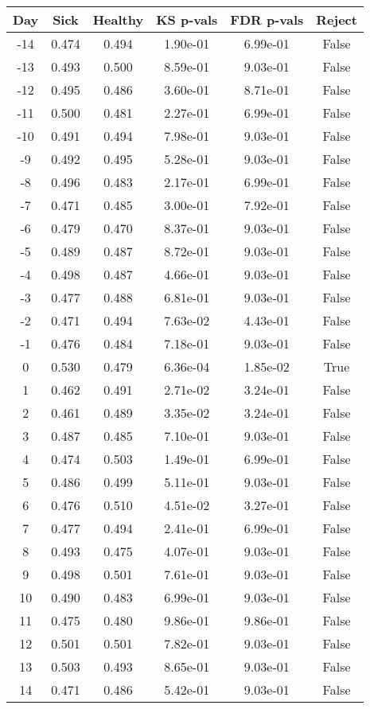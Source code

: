 \begin{tabular}{c|c|c|c|c|c}
Day &  Sick & Healthy &  KS p-vals & FDR p-vals & Reject\\
\hline
-14 & 0.474 &   0.494 &   1.90e-01 &   6.99e-01 &  False\\
-13 & 0.493 &   0.500 &   8.59e-01 &   9.03e-01 &  False\\
-12 & 0.495 &   0.486 &   3.60e-01 &   8.71e-01 &  False\\
-11 & 0.500 &   0.481 &   2.27e-01 &   6.99e-01 &  False\\
-10 & 0.491 &   0.494 &   7.98e-01 &   9.03e-01 &  False\\
 -9 & 0.492 &   0.495 &   5.28e-01 &   9.03e-01 &  False\\
 -8 & 0.496 &   0.483 &   2.17e-01 &   6.99e-01 &  False\\
 -7 & 0.471 &   0.485 &   3.00e-01 &   7.92e-01 &  False\\
 -6 & 0.479 &   0.470 &   8.37e-01 &   9.03e-01 &  False\\
 -5 & 0.489 &   0.487 &   8.72e-01 &   9.03e-01 &  False\\
 -4 & 0.498 &   0.487 &   4.66e-01 &   9.03e-01 &  False\\
 -3 & 0.477 &   0.488 &   6.81e-01 &   9.03e-01 &  False\\
 -2 & 0.471 &   0.494 &   7.63e-02 &   4.43e-01 &  False\\
 -1 & 0.476 &   0.484 &   7.18e-01 &   9.03e-01 &  False\\
  0 & 0.530 &   0.479 &   6.36e-04 &   1.85e-02 &   True\\
  1 & 0.462 &   0.491 &   2.71e-02 &   3.24e-01 &  False\\
  2 & 0.461 &   0.489 &   3.35e-02 &   3.24e-01 &  False\\
  3 & 0.487 &   0.485 &   7.10e-01 &   9.03e-01 &  False\\
  4 & 0.474 &   0.503 &   1.49e-01 &   6.99e-01 &  False\\
  5 & 0.486 &   0.499 &   5.11e-01 &   9.03e-01 &  False\\
  6 & 0.476 &   0.510 &   4.51e-02 &   3.27e-01 &  False\\
  7 & 0.477 &   0.494 &   2.41e-01 &   6.99e-01 &  False\\
  8 & 0.493 &   0.475 &   4.07e-01 &   9.03e-01 &  False\\
  9 & 0.498 &   0.501 &   7.61e-01 &   9.03e-01 &  False\\
 10 & 0.490 &   0.483 &   6.99e-01 &   9.03e-01 &  False\\
 11 & 0.475 &   0.480 &   9.86e-01 &   9.86e-01 &  False\\
 12 & 0.501 &   0.501 &   7.82e-01 &   9.03e-01 &  False\\
 13 & 0.503 &   0.493 &   8.65e-01 &   9.03e-01 &  False\\
 14 & 0.471 &   0.486 &   5.42e-01 &   9.03e-01 &  False\\
\end{tabular}